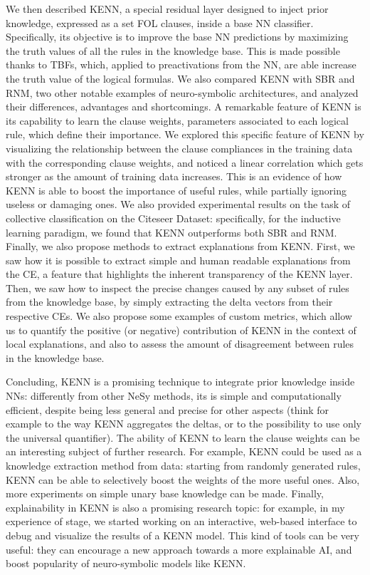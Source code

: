We then described KENN, a special residual layer designed to inject prior knowledge, expressed as a set FOL clauses, inside a base NN classifier. Specifically, its objective is to improve the base NN predictions by maximizing the truth values of all the rules in the knowledge base. This is made possible thanks to TBFs, which, applied to preactivations from the NN, are able increase the truth value of the logical formulas. We also compared KENN with SBR and RNM, two other notable examples of neuro-symbolic architectures, and analyzed their differences, advantages and shortcomings.
A remarkable feature of KENN is its capability to learn the clause weights, parameters associated to each logical rule, which define their importance. We explored this specific feature of KENN by visualizing the relationship between the clause compliances in the training data with the corresponding clause weights, and noticed a linear correlation which gets stronger as the amount of training data increases. This is an evidence of how KENN is able to boost the importance of useful rules, while partially ignoring useless or damaging ones. We also provided experimental results on the task of collective classification on the Citeseer Dataset: specifically, for the inductive learning paradigm, we found that KENN outperforms both SBR and RNM. Finally, we also propose methods to extract explanations from KENN. 
First, we saw how it is possible to extract simple and human readable explanations from the CE, a feature that highlights the inherent transparency of the KENN layer. Then, we saw how to inspect the precise changes caused by any subset of rules from the knowledge base, by simply extracting the delta vectors from their respective CEs. We also propose some examples of custom metrics, which allow us to quantify the positive (or negative) contribution of KENN in the context of local explanations, and also to assess the amount of disagreement between rules in the knowledge base.

Concluding, KENN is a promising technique to integrate prior knowledge inside NNs: differently from other NeSy methods, its is simple and computationally efficient, despite being less general and precise for other aspects (think for example to the way KENN aggregates the deltas, or to the possibility to use only the universal quantifier). The ability of KENN to learn the clause weights can be an interesting subject of further research. For example, KENN could be used as a knowledge extraction method from data: starting from randomly generated rules, KENN can be able to selectively boost the weights of the more useful ones. Also, more experiments on simple unary base knowledge can be made. 
Finally, explainability in KENN is also a promising research topic: for example, in my experience of stage, we started working on an interactive, web-based interface to debug and visualize the results of a KENN model. This kind of tools can be very useful: they can encourage a new approach towards a more explainable AI, and boost popularity of neuro-symbolic models like KENN. 